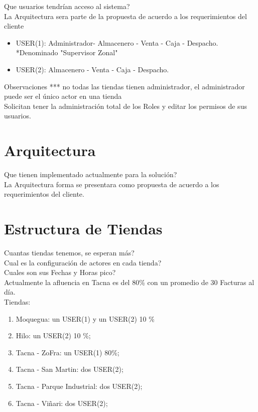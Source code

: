 \documentclass[pdftex,12pt,oneside,a4paper,spanish, english, brazil]{abntex2}
\begin{document}
\begin{sloppypar}
            Que usuarios tendrían acceso al sistema?\\
            La Arquitectura sera parte de la propuesta de acuerdo a los requerimientos del cliente
            
            \begin{itemize}
            	\item USER(1): Administrador- Almacenero - Venta - Caja - Despacho. *Denominado "Supervisor Zonal"
            	\item USER(2): Almacenero - Venta - Caja - Despacho.
            \end{itemize}
            
            	Observaciones *** no todas las tiendas tienen administrador, el administrador puede ser el único actor en una tienda\\
            	Solicitan tener la administración total de los Roles y editar los permisos de sus usuarios.

            \section{Arquitectura}
            Que tienen implementado actualmente para la solución?\\
            La Arquitectura forma se presentara como propuesta de acuerdo a los requerimientos del cliente.
            \section{Estructura de Tiendas}
            Cuantas tiendas tenemos, se esperan más?\\
            Cual es la configuración de actores en cada tienda?\\
            Cuales son sus Fechas y Horas pico?\\
            	Actualmente la afluencia en Tacna es del 80\%  con un promedio de 30 Facturas al día.\\
            	Tiendas:\\
            \begin{enumerate}
            	\item Moquegua: un USER(1) y un USER(2) 10 \% 
            	\item Hilo: un USER(2) 10 \%;
            	\item Tacna - ZoFra:  un USER(1) 80\%;
            	\item Tacna - San Martin: dos USER(2);
            	\item Tacna - Parque Industrial: dos USER(2);
            	\item Tacna - Viñari: dos USER(2);
            \end{enumerate}
            

\end{sloppypar}
\end{document}
